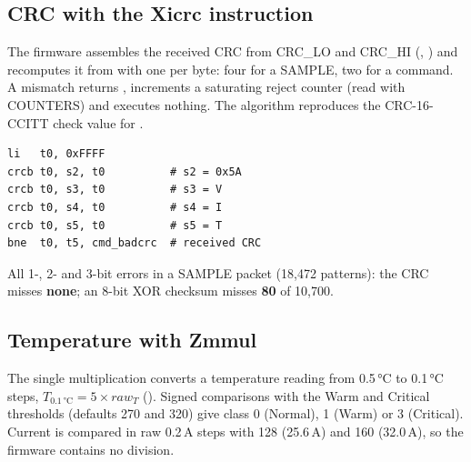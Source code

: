 \subsection{CRC with the Xicrc instruction}\label{sec:crc}
\noindent\begin{minipage}[t]{0.5\linewidth}\RaggedRight
\vspace{0pt}
The firmware assembles the received CRC from CRC\_LO and CRC\_HI (, ) and recomputes it from  with one  per byte: four for a SAMPLE, two for a command. A mismatch returns , increments a saturating reject counter (read with COUNTERS) and executes nothing. The algorithm reproduces the CRC-16-CCITT check value  for .
\end{minipage}\hfill
\begin{minipage}[t]{0.47\linewidth}
\vspace{0pt}
\begin{lstlisting}
li   t0, 0xFFFF
crcb t0, s2, t0          # s2 = 0x5A
crcb t0, s3, t0          # s3 = V
crcb t0, s4, t0          # s4 = I
crcb t0, s5, t0          # s5 = T
bne  t0, t5, cmd_badcrc  # received CRC
\end{lstlisting}
\begin{keyresult}
All 1-, 2- and 3-bit errors in a SAMPLE packet (18,472 patterns): the CRC misses \textbf{none}; an 8-bit XOR checksum misses \textbf{80} of 10,700.
\end{keyresult}
\end{minipage}

\subsection{Temperature with Zmmul}\label{sec:zmmul}
The single multiplication converts a temperature reading from 0.5\,°C to 0.1\,°C steps, $T_{0.1\,°\mathrm{C}} = 5 \times \mathit{raw}_T$ (). Signed comparisons with the Warm and Critical thresholds (defaults 270 and 320) give class 0 (Normal), 1 (Warm) or 3 (Critical). Current is compared in raw 0.2\,A steps with 128 (25.6\,A) and 160 (32.0\,A), so the firmware contains no division.

